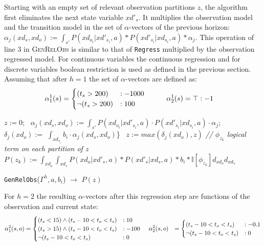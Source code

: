 \documentclass{article} %
\begin{document}
Starting with an empty set of relevant observation partitions $z$, the algorithm first eliminates the next state variable $xd'_s$. It multiplies the observation model and the transition model in the set of $\alpha$-vectors of the previous horizon:
$\alpha_j(xd_s,xd_o) := \int_{s'} P(xd_{o_i}|xd'_{s_i},a) * P(xd'_{s_i}| xd_{s_i},a)* \alpha_j $. 
This operation of line 3 in \textsc{GenRelObs} is similar to that of \texttt{Regress} multiplied by the observation regressed model. For continuous variables the continuous regression and for discrete variables boolean restriction is used as defined in the previous section. 
Assuming that after $h=1$ the set of $\alpha$-vectors are defined as:
{\footnotesize
\begin{align}
\alpha_1^1(s) &= 
\begin{cases}
 (t_s>200) &: -1000 \\
\neg(t_s>200) &: 100 \\
\end{cases}
\hspace{10mm} 
\alpha_2^1(s) = \top: -1 \nonumber
\end{align}
}
\incmargin{.5em}
\linesnumbered
\begin{algorithm}[t!]
\vspace{-.5mm}
\dontprintsemicolon
{}

\Begin
{
	$z:=0$;\	
		{
    	$\alpha_j(xd_s,xd_o) := \int_{s'} P(xd_{o_i}|xd'_{s_i},a) \cdot P(xd'_{s_i}| xd_{s_i},a)\cdot \alpha_j $;\
		}  
		\For {all $j$ in $\alpha_j(xd_s,xd_o)$}    
		{
		$\delta_{j}(xd_o) := $ $\int_{xd_{s_i}} b_i \cdot \alpha_j(xd_s,xd_o)$\}\ \;
		}
		\For {all $j$ in $\delta_{j}(xd_o)$}    
		{
		$z := max(\delta_j(xd_o),z)$\;
    	}
    	\emph{// $\phi_{z_k}$ logical term on each partition of $z$}\\
   		$P(z_k) := \int_{xd_o}\int_{xd_s} P(xd_o|xd'_s,a)*P(xd'_s|xd_s,a)*b_i* \mathbb{I}[\phi_{z_k}] d_{xd_o} d_{xd_s}$ \;
    \Return{$P(z)$} \;
}
\caption{\footnotesize \texttt{GenRelObs}($\Gamma^h,a,b_i$) $\longrightarrow$ $P(z)$ }
\vspace{-1mm}
\end{algorithm}
\decmargin{.5em}
For $h=2$ the resulting $\alpha$-vectors after this regression step are functions of the observation and current state: 
{\footnotesize
\begin{align}
\alpha_1^2(s,o) &= 
\begin{cases}
 (t_s<15)\wedge (t_s - 10 < t_o<t_s) &: 10 \\
(t_s>15)\wedge (t_s - 10 < t_o<t_s) &: -100  \\
\neg(t_s - 10 < t_o<t_s) &: 0
\end{cases}
\hspace{4mm} 
\alpha_2^2(s,o) &= \begin{cases}
(t_s - 10 < t_o<t_s) &: -0.1 \\
\neg(t_s - 10 < t_o<t_s) &: 0
\end{cases}
\nonumber
\end{align}
}
\end{document}
